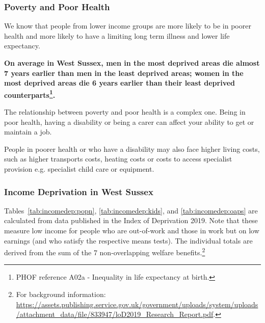 \subsubsection{Poverty and Poor Health}
We know that people from lower income groups are more likely to be in poorer health and more likely to have a limiting long term illness and lower life expectancy.

{\bf On average in West Sussex, men in the most deprived areas die almost 7 years earlier than men in the least deprived areas; women in the most deprived areas die 6 years earlier than their least deprived counterparts\footnote{PHOF reference A02a - Inequality in life expectancy at birth.}.}

The relationship between poverty and poor health is a complex one. Being in poor health, having a disability or being a carer can affect your ability to get or maintain a job.

People in poorer health or who have a disability may also face higher living costs, such as higher transports costs, heating costs or costs to access specialist provision e.g. specialist child care or equipment.

\subsubsection{Income Deprivation in West Sussex}
Tables~\ref{tab:incomedep:popn}, \ref{tab:incomedep:kids}, and \ref{tab:incomedep:oaps} are calculated from data published in the Index of Deprivation 2019. Note that these measure low income for people who are out-of-work and those in work but on low earnings (and who satisfy the respective means tests). The individual totals are derived from the sum of the 7 non-overlapping welfare benefits.\footnote{For background information: \url{https://assets.publishing.service.gov.uk/government/uploads/system/uploads/attachment_data/file/833947/loD2019_Research_Report.pdf}.}

